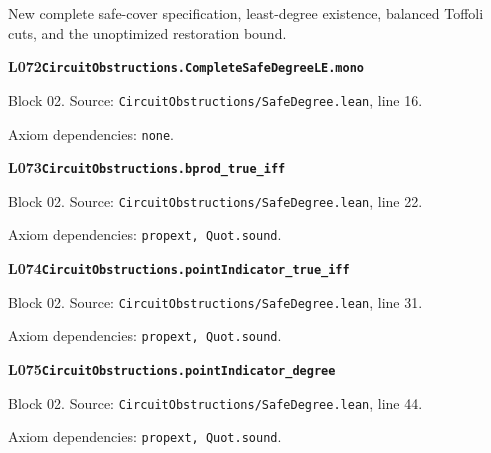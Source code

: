 New complete safe-cover specification, least-degree existence, balanced Toffoli cuts, and the unoptimized restoration bound.
\par\medskip

\begin{minipage}{\linewidth}
\hypertarget{L072}{}
{\small\sffamily\bfseries\color{ink}L072\quad\nolinkurl{CircuitObstructions.CompleteSafeDegreeLE.mono}}\par
{\scriptsize\sffamily\color{muted}Block 02. Source: \nolinkurl{CircuitObstructions/SafeDegree.lean}, line 16.}\par
{}
{\scriptsize\sffamily\color{muted}Axiom dependencies: \nolinkurl{none}.}
\end{minipage}\par\medskip
\begin{minipage}{\linewidth}
\hypertarget{L073}{}
{\small\sffamily\bfseries\color{ink}L073\quad\nolinkurl{CircuitObstructions.bprod_true_iff}}\par
{\scriptsize\sffamily\color{muted}Block 02. Source: \nolinkurl{CircuitObstructions/SafeDegree.lean}, line 22.}\par
{}
{\scriptsize\sffamily\color{muted}Axiom dependencies: \nolinkurl{propext, Quot.sound}.}
\end{minipage}\par\medskip
\begin{minipage}{\linewidth}
\hypertarget{L074}{}
{\small\sffamily\bfseries\color{ink}L074\quad\nolinkurl{CircuitObstructions.pointIndicator_true_iff}}\par
{\scriptsize\sffamily\color{muted}Block 02. Source: \nolinkurl{CircuitObstructions/SafeDegree.lean}, line 31.}\par
{}
{\scriptsize\sffamily\color{muted}Axiom dependencies: \nolinkurl{propext, Quot.sound}.}
\end{minipage}\par\medskip
\begin{minipage}{\linewidth}
\hypertarget{L075}{}
{\small\sffamily\bfseries\color{ink}L075\quad\nolinkurl{CircuitObstructions.pointIndicator_degree}}\par
{\scriptsize\sffamily\color{muted}Block 02. Source: \nolinkurl{CircuitObstructions/SafeDegree.lean}, line 44.}\par
{}
{\scriptsize\sffamily\color{muted}Axiom dependencies: \nolinkurl{propext, Quot.sound}.}
\end{minipage}\par\medskip
